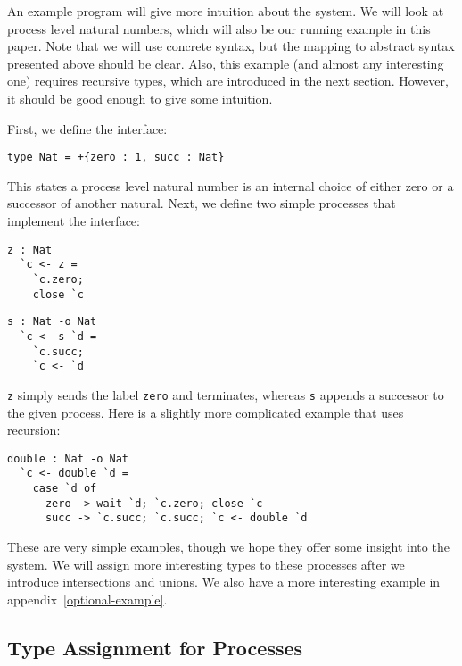 \documentclass[a4paper,USenglish]{lipics-v2016}
\begin{document}
An example program will give more intuition about the system. We will look at process level natural numbers, which will also be our running example in this paper. Note that we will use concrete syntax, but the mapping to abstract syntax presented above should be clear. Also, this example (and almost any interesting one) requires recursive types, which are introduced in the next section. However, it should be good enough to give some intuition.

First, we define the interface:

\begin{lstlisting}[language=krill, style=custom]
  type Nat = +{zero : 1, succ : Nat}
\end{lstlisting}

This states a process level natural number is an internal choice of either zero or a successor of another natural. Next, we define two simple processes that implement the interface:

\begin{minipage}{.48\textwidth}
\begin{lstlisting}[language=krill, style=custom]
  z : Nat
  `c <- z =
    `c.zero;
    close `c
\end{lstlisting}
\end{minipage}
\hfill
\begin{minipage}{.48\textwidth}
\begin{lstlisting}[language=krill, style=custom]
  s : Nat -o Nat
  `c <- s `d =
    `c.succ;
    `c <- `d
\end{lstlisting}
\end{minipage}

\texttt{z} simply sends the label \texttt{zero} and terminates, whereas \texttt{s} appends a successor to the given process. Here is a slightly more complicated example that uses recursion:

\begin{lstlisting}[language=krill, style=custom]
  double : Nat -o Nat
  `c <- double `d =
    case `d of
      zero -> wait `d; `c.zero; close `c
      succ -> `c.succ; `c.succ; `c <- double `d
\end{lstlisting}

These are very simple examples, though we hope they offer some insight into the system. We will assign more interesting types to these processes after we introduce intersections and unions. We also have a more interesting example in appendix~\ref{optional-example}.


\subsection{Type Assignment for Processes}
\end{document}
